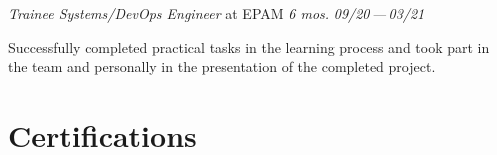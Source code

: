\documentclass[11pt]{letter}
\newcommand{\forceindent}{\leavevmode{\parindent=1em\indent} %
}
\begin{document}
\begin{etaremune}[
  topsep=1ex,itemsep=1.5ex,partopsep=0ex,
  parsep=0ex,rightmargin=1em,leftmargin=2em
]

  \item
    \emph{Trainee Systems/DevOps Engineer}\hfill
    at EPAM\hspace{6.3em}
    \textit{6 mos.}\hspace{5em}
    \textit{09/20\,—\,03/21}\vspace{1em}\newline


	\forceindent Successfully completed practical tasks in the learning process and took part in the team and personally in the presentation of the completed project.\\
\end{etaremune}

\section*{Certifications\vphantom{certs}}
\end{document}
